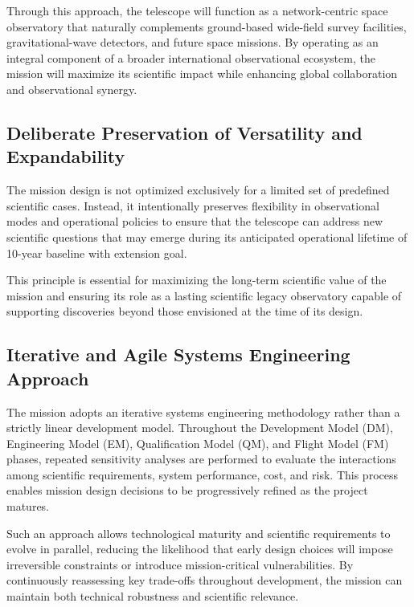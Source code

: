 Through this approach, the telescope will function as a network-centric space observatory that naturally complements ground-based wide-field survey facilities, gravitational-wave detectors, and future space missions. By operating as an integral component of a broader international observational ecosystem, the mission will maximize its scientific impact while enhancing global collaboration and observational synergy.

\subsection{Deliberate Preservation of Versatility and Expandability}

The mission design is not optimized exclusively for a limited set of predefined scientific cases. Instead, it intentionally preserves flexibility in observational modes and operational policies to ensure that the telescope can address new scientific questions that may emerge during its anticipated operational lifetime of 10-year baseline with extension goal.

This principle is essential for maximizing the long-term scientific value of the mission and ensuring its role as a lasting scientific legacy observatory capable of supporting discoveries beyond those envisioned at the time of its design.

\subsection{Iterative and Agile Systems Engineering Approach}

The mission adopts an iterative systems engineering methodology rather than a strictly linear development model. Throughout the Development Model (DM), Engineering Model (EM), Qualification Model (QM), and Flight Model (FM) phases, repeated sensitivity analyses are performed to evaluate the interactions among scientific requirements, system performance, cost, and risk. This process enables mission design decisions to be progressively refined as the project matures.

Such an approach allows technological maturity and scientific requirements to evolve in parallel, reducing the likelihood that early design choices will impose irreversible constraints or introduce mission-critical vulnerabilities. By continuously reassessing key trade-offs throughout development, the mission can maintain both technical robustness and scientific relevance.

